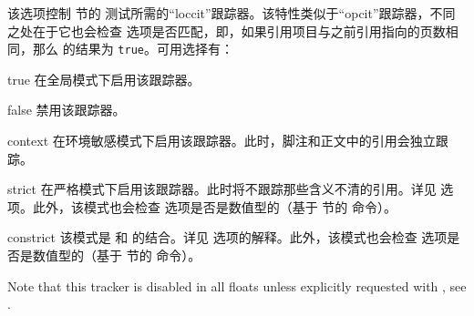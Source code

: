 \begin{optionlist}

该选项控制  节的  测试所需的“loccit”跟踪器。该特性类似于“opcit”跟踪器，不同之处在于它也会检查  选项是否匹配，即，如果引用项目与之前引用指向的页数相同，那么  的结果为 \texttt{true}。可用选择有：

\begin{valuelist}
\item[true] %
在全局模式下启用该跟踪器。
\item[false] %
禁用该跟踪器。
\item[context] %
在环境敏感模式下启用该跟踪器。此时，脚注和正文中的引用会独立跟踪。
\item[strict] %
在严格模式下启用该跟踪器。此时将不跟踪那些含义不清的引用。详见  选项。此外，该模式也会检查  选项是否是数值型的（基于  节的  命令）。
\item[constrict] %
该模式是  和  的结合。详见   选项的解释。此外，该模式也会检查  选项是否是数值型的（基于  节的  命令）。
\end{valuelist}
Note that this tracker is disabled in all floats unless explicitly requested with , see .



\end{optionlist}
